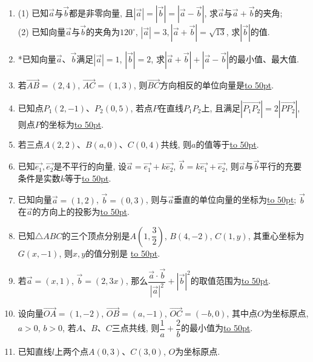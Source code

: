 \documentclass[10pt,a4paper]{article}
\newcommand{\blank}[1]{\underline{\hbox to #1pt{}}}
\begin{document}
\begin{enumerate}[1.]
\item (1) 已知$\overrightarrow a$与$\overrightarrow b$都是非零向量, 且$|\overrightarrow a|=|\overrightarrow b|=|\overrightarrow a-\overrightarrow b|$, 求$\overrightarrow a$与$\overrightarrow a+\overrightarrow b$的夹角;\\
(2) 已知向量$\overrightarrow a$与$\overrightarrow b$的夹角为$120^\circ$, $|\overrightarrow a|=3,|\overrightarrow a+\overrightarrow b|=\sqrt{13}$, 求$|\overrightarrow b|$的值.
\item *已知向量$\overrightarrow a$、$\overrightarrow b$满足$| \overrightarrow a|=1$, $|\overrightarrow{b}|=2$, 求$|\overrightarrow a+\overrightarrow b|+|\overrightarrow a-\overrightarrow b|$的最小值、最大值.




\item 若$\overrightarrow{AB}=(2,4)$, $\overrightarrow{AC}=(1,3)$, 则$\overrightarrow{BC}$方向相反的单位向量是\blank{50}.
\item 已知点$P_1(2,-1)$、$P_2(0,5)$, 若点$P$在直线$P_1P_2$上, 且满足$|\overrightarrow{P_1P_2}|=2|\overrightarrow{PP_2}|$, 则点$P$的坐标为\blank{50}.
\item 若三点$A(2,2)$、$B(a,0)$、$C(0,4)$共线, 则$a$的值等于\blank{50}.
\item 已知$\overrightarrow{e_1},\overrightarrow{e_2}$是不平行的向量, 设$\overrightarrow a=\overrightarrow {e_1}+k\overrightarrow {e_2}$, $\overrightarrow b=k\overrightarrow {e_1}+\overrightarrow {e_2}$, 则$\overrightarrow a$与$\overrightarrow b$平行的充要条件是实数$k$等于\blank{50}.
\item 已知向量$\overrightarrow a=(1,2)$, $\overrightarrow b=(0,3)$, 则与$\overrightarrow a$垂直的单位向量的坐标为\blank{50}; $\overrightarrow b$在$\overrightarrow a$的方向上的投影为\blank{50}.
\item 已知$\triangle ABC$的三个顶点分别是$A(1,\dfrac 32)$, $B(4,-2)$, $C(1,y)$, 其重心坐标为$G(x,-1)$, 则$x,y$的值分别是
\blank{50}.
\item 若$\overrightarrow a=(x,1)$, $\overrightarrow b=(2,3x)$, 那么$\dfrac{\overrightarrow a\cdot \overrightarrow b}{| \overrightarrow a|^2}+{|\overrightarrow b |^2}$的取值范围为\blank{50}.
\item 设向量$\overrightarrow{OA}=(1,-2)$, $\overrightarrow{OB}=(a,-1)$, $\overrightarrow{OC}=(-b,0)$, 其中点$O$为坐标原点, $a>0$, $b>0$, 若$A$、$B$、$C$三点共线, 则$\dfrac 1a+\dfrac 2b$的最小值为\blank{50}.
\item 已知直线$l$上两个点$A(0,3)$、$C(3,0)$, $O$为坐标原点.\\

\end{enumerate}
\end{document}
